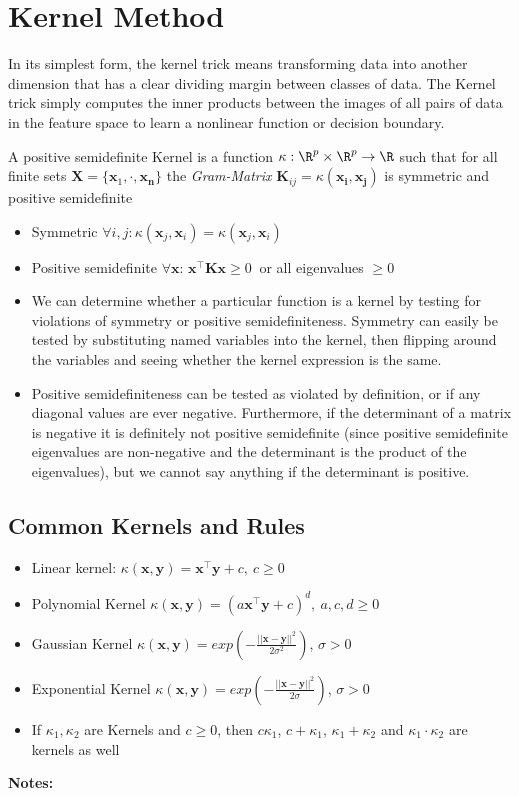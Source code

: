\documentclass[english]{latex4ei/latex4ei_sheet}
\begin{document}
\section{Kernel Method}
\begin{sectionbox}
In its simplest form, the kernel trick means transforming data into another dimension that has a clear dividing margin between classes of data. The Kernel trick simply computes the inner products between the images of all pairs of data in the feature space to learn a nonlinear function or decision boundary.
\begin{emphbox}
    A positive semidefinite Kernel is a function $\kappa: \R^{p}\times \R^{p}\rightarrow\R$ such that for all finite sets $\mathbf{X}=\{\mathbf{x}_1,\cdot,\mathbf{x_n}\}$ the \emph{Gram-Matrix} $\mathbf{K}_{ij} = \kappa(\mathbf{x_i,x_j})$ is symmetric and positive semidefinite  
\end{emphbox}
\begin{itemize}
    \item Symmetric $\forall i,j: \kappa(\mathbf{x}_j,\mathbf{x}_i)=\kappa(\mathbf{x}_j,\mathbf{x}_i)$
    \item Positive semidefinite $\forall \mathbf{x}$: $\mathbf{x}^{\top}\mathbf{Kx}\ge 0\ $ or all eigenvalues $\ge 0$
    \item We can determine whether a particular function is a kernel by testing for violations of symmetry or positive semidefiniteness.
    Symmetry can easily be tested by substituting named variables into the kernel, then flipping around the variables and seeing whether the kernel expression is the same.
    \item Positive semidefiniteness can be tested as violated by definition, or if any diagonal values are ever negative. Furthermore, if the determinant of a matrix is negative it is definitely not positive semidefinite (since positive semidefinite eigenvalues are non-negative and the determinant is the product of the eigenvalues), but we cannot say anything if the determinant is positive.
\end{itemize}
\subsection{Common Kernels and Rules}
\begin{itemize}
    \item Linear kernel: $\kappa(\mathbf{x,y})=\mathbf{x^{\top}y}+c, \ c\ge0$
    \item Polynomial Kernel $\kappa(\mathbf{x,y})=(a\mathbf{x^{\top}y}+c)^d,\ a,c,d\ge0 $
    \item Gaussian Kernel $\kappa(\mathbf{x,y})=exp(-\frac{||\mathbf{x-y}||^2}{2\sigma^2})$, $\sigma>0$
    \item Exponential Kernel $\kappa(\mathbf{x,y})=exp(-\frac{||\mathbf{x-y}||^2}{2\sigma})$, $\sigma>0$
    \item If $\kappa_1, \kappa_2$ are Kernels and $c\ge0$, then $c\kappa_1$, $c+\kappa_1$, $\kappa_1+\kappa_2$ and $\kappa_1\cdot\kappa_2$ are kernels as well
\end{itemize}
\end{sectionbox}
\textbf{Notes:}
\end{document}
